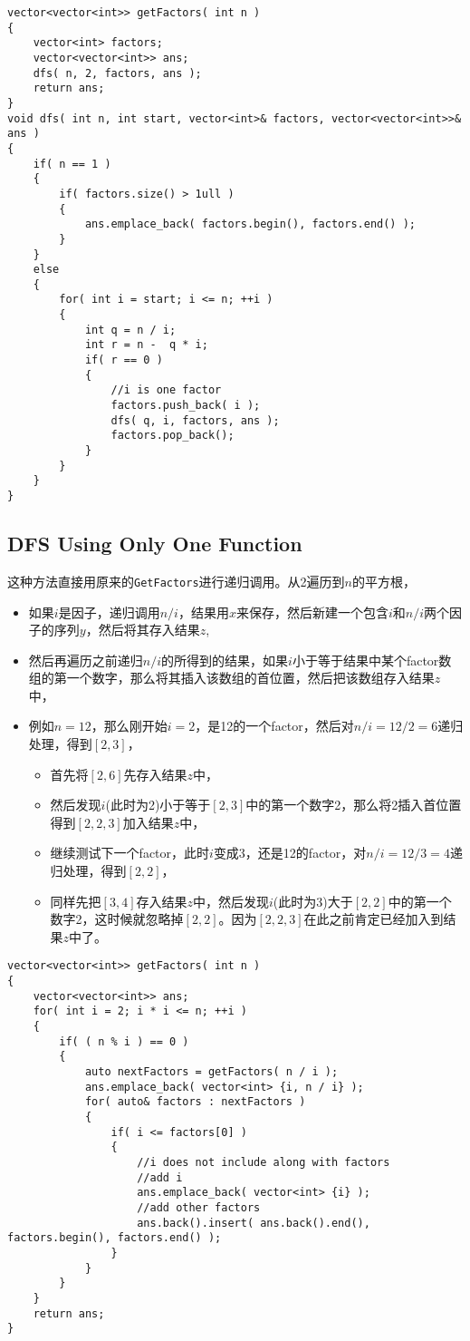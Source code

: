 \setcounter{lstlisting}{0}
\begin{lstlisting}[style=customc, caption={Backtracking}]
vector<vector<int>> getFactors( int n )
{
    vector<int> factors;
    vector<vector<int>> ans;
    dfs( n, 2, factors, ans );
    return ans;
}
void dfs( int n, int start, vector<int>& factors, vector<vector<int>>& ans )
{
    if( n == 1 )
    {
        if( factors.size() > 1ull )
        {
            ans.emplace_back( factors.begin(), factors.end() );
        }
    }
    else
    {
        for( int i = start; i <= n; ++i )
        {
            int q = n / i;
            int r = n -  q * i;
            if( r == 0 )
            {
                //i is one factor
                factors.push_back( i );
                dfs( q, i, factors, ans );
                factors.pop_back();
            }
        }
    }
}
\end{lstlisting}
\subsection{DFS Using Only One Function}
这种方法直接用原来的\texttt{GetFactors}进行递归调用。从2遍历到$n$的平方根，
\begin{itemize}
\item 如果$i$是因子，递归调用$n/i$，结果用$x$来保存，然后新建一个包含$i$和$n/i$两个因子的序列$y$，然后将其存入结果$z$,
\item 然后再遍历之前递归$n/i$的所得到的结果，如果$i$小于等于结果中某个factor数组的第一个数字，那么将其插入该数组的首位置，然后把该数组存入结果$z$中，
\item 例如$n = 12$，那么刚开始$i = 2$，是12的一个factor，然后对$n/i=12/2=6$递归处理，得到$[2,3]$，
\begin{itemize}
\item 首先将$[2, 6]$先存入结果$z$中，
\item 然后发现$i$(此时为2)小于等于$[2, 3]$中的第一个数字2，那么将2插入首位置得到$[2, 2, 3]$加入结果$z$中，
\item 继续测试下一个factor，此时$i$变成3，还是12的factor，对$n/i=12/3=4$递归处理，得到$[2, 2]$，
\item 同样先把$[3, 4]$存入结果$z$中，然后发现$i$(此时为3)大于$[2, 2]$中的第一个数字2，这时候就忽略掉$[2,2]$。因为$[2,2,3]$在此之前肯定已经加入到结果$z$中了。
\end{itemize}
\end{itemize}
\begin{lstlisting}[style=customc, caption={Another DFS Approach}]
vector<vector<int>> getFactors( int n )
{
    vector<vector<int>> ans;
    for( int i = 2; i * i <= n; ++i )
    {
        if( ( n % i ) == 0 )
        {
            auto nextFactors = getFactors( n / i );
            ans.emplace_back( vector<int> {i, n / i} );
            for( auto& factors : nextFactors )
            {
                if( i <= factors[0] )
                {
                    //i does not include along with factors
                    //add i
                    ans.emplace_back( vector<int> {i} );
                    //add other factors
                    ans.back().insert( ans.back().end(), factors.begin(), factors.end() );
                }
            }
        }
    }
    return ans;
}
\end{lstlisting}